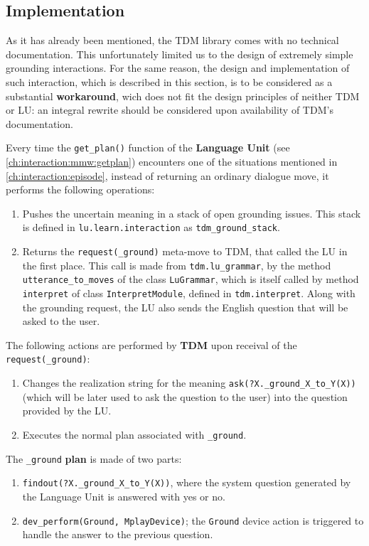 \subsection{Implementation} \label{ch:interaction:episode:impl}

As it has already been mentioned, the TDM library comes with no technical documentation. This unfortunately limited us to the design of extremely simple grounding interactions. For the same reason, the design and implementation of such interaction, which is described in this section, is to be considered as a substantial \textbf{workaround}, wich does not fit the design principles of neither TDM or LU: an integral rewrite should be considered upon availability of TDM's documentation.

Every time the \texttt{get\_plan()} function of the \textbf{Language Unit} (see \ref{ch:interaction:mmw:getplan}) encounters one of the situations mentioned in \ref{ch:interaction:episode}, instead of returning an ordinary dialogue move, it performs the following operations: 
\begin{enumerate}
	\item Pushes the uncertain meaning in a stack of open grounding issues. This stack is defined in \texttt{lu.learn.interaction} as \texttt{tdm\_ground\_stack}.
	\item Returns the \texttt{request(\_ground)} meta-move to TDM, that called the LU in the first place. This call is made from \texttt{tdm.lu\_grammar}, by the method \texttt{utterance\_to\_moves} of the class \texttt{LuGrammar}, which is itself called by method \texttt{interpret} of class \texttt{InterpretModule}, defined in \texttt{tdm.interpret}. Along with the grounding request, the LU also sends the English question that will be asked to the user.
\end{enumerate}

The following actions are performed by \textbf{TDM} upon receival of the \texttt{request(\_ground)}:
\begin{enumerate}
	\item Changes the realization string for the meaning \texttt{ask(?X.\_ground\_X\_to\_Y(X))} (which will be later used to ask the question to the user)  into the question provided by the LU.
	\item Executes the normal plan associated with  \texttt{\_ground}.
\end{enumerate}

The \texttt{\_ground} \textbf{plan} is made of two parts:
\begin{enumerate}
	\item \texttt{findout(?X.\_ground\_X\_to\_Y(X))}, where the system question generated by the Language Unit is answered with yes or no.
	\item \texttt{dev\_perform(Ground, MplayDevice)}; the \texttt{Ground} device action is triggered to handle the answer to the previous question.
\end{enumerate}

